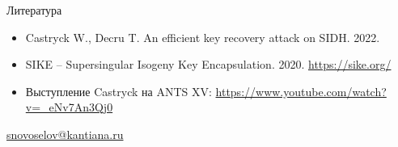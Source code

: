 \documentclass{beamer}
\begin{document}
\begin{frame}{Литература}
	\begin{itemize}
		\item[\structure{{\faScroll}}] Castryck W., Decru T. An efficient key recovery attack
		on SIDH. 2022.
		\vspace{0.5em}
		
		\item[\structure{{\faGlobe}}] SIKE – Supersingular Isogeny Key Encapsulation. 2020. \url{https://sike.org/}
		\vspace{0.5em}
		
		\item[\structure{{\faYoutube}}]
		Выступление Castryck на ANTS XV:
		\url{https://www.youtube.com/watch?v=_eNv7An3Qj0}
	\end{itemize}

    \begin{center}
        \begin{tcolorbox}[enhanced,hbox,colback=block-green-color-bg,colframe=subsection-color!120,title=Контакты,center title]
            \begin{varwidth}{\textwidth}
                \begin{center}
                    \href{mailto:snovoselov@kantiana.ru}{snovoselov@kantiana.ru}
                \end{center}
            \end{varwidth}
        \end{tcolorbox}
    \end{center}\end{frame}
\end{document}
